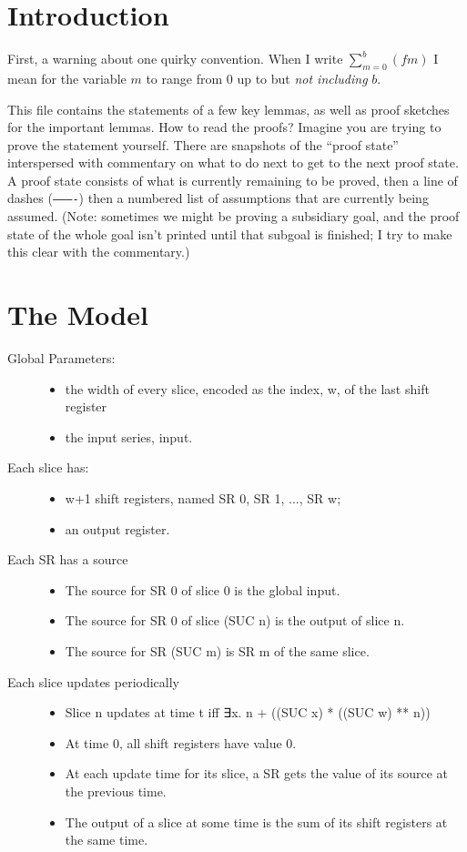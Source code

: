 \documentclass{article}
\begin{document}
\section*{Introduction}
First, a warning about one quirky convention.
When I write $\sum_{m=0}^b (f m)$ I mean for the variable $m$ to range from $0$ up to but \emph{not including} $b$.

This file contains the statements of a few key lemmas, as well as proof sketches for the important lemmas.
How to read the proofs?
Imagine you are trying to prove the statement yourself.
There are snapshots of the ``proof state'' interspersed with commentary on what to do next to get to the next proof state.
A proof state consists of what is currently remaining to be proved, then a line of dashes (\texttt{----------}) then a numbered list of assumptions that are currently being assumed.
(Note: sometimes we might be proving a subsidiary goal, and the proof state of the whole goal isn't printed until that subgoal is finished; I try to make this clear with the commentary.)

\section*{The Model}
\begin{description}
\item[Global Parameters:]\hfill
\begin{itemize}
\item
     the width of every slice, encoded as the index, w, of the last shift register
\item
     the input series, input.
\end{itemize}
\item[Each slice has:]\hfill
\begin{itemize}
\item
     w+1 shift registers, named SR 0, SR 1, ..., SR w;
\item
     an output register.
\end{itemize}
\item[Each SR has a source]\hfill
\begin{itemize}
\item
     The source for SR 0 of slice 0 is the global input.
\item
     The source for SR 0 of slice (SUC n) is the output of slice n.
\item
     The source for SR (SUC m) is SR m of the same slice.
\end{itemize}
\item[Each slice updates periodically]\hfill
\begin{itemize}
\item
     Slice n updates at time t iff ∃x. n + ((SUC x) * ((SUC w) ** n))
\item
   At time 0, all shift registers have value 0.
\item
   At each update time for its slice, a SR gets the value of its source at the previous time.
\item
   The output of a slice at some time is the sum of its shift registers at the same time.
\end{itemize}
\end{description}
\end{document}
